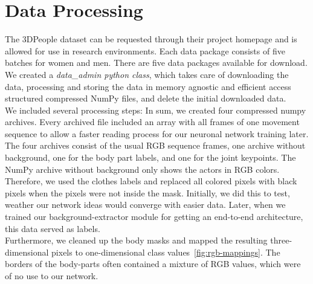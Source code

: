 \section{Data Processing}
The 3DPeople dataset can be requested through their project homepage and is allowed for use in research
environments.
Each data package consists of five batches for women and men. There are five data packages available for download.
We created a \textit{data\_admin python class}, which takes care of downloading the data, processing and storing the
data
in memory agnostic and efficient access structured compressed NumPy files, and delete the initial downloaded data.\\
We included several processing steps:
In sum, we created four compressed numpy archives.
Every archived file included an array with all frames of one movement sequence to allow a faster reading process for
our neuronal network training later.
The four archives consist of the usual RGB sequence frames, one archive without background, one for the body part
labels,
and one for the joint keypoints.
The NumPy archive without background only shows the actors in RGB colors.
Therefore, we used the clothes labels and replaced all colored pixels with black pixels when the pixels were not
inside the mask.
Initially, we did this to test, weather our network ideas would converge with easier data.
Later, when we trained our background-extractor module for getting an end-to-end architecture, this data served as
labels.\\
Furthermore, we cleaned up the body masks and mapped the resulting three-dimensional pixels to one-dimensional class
values~\autoref{fig:rgb-mappings}.
The borders of the body-parts often contained a mixture of RGB values, which were of no use to our network.\\

